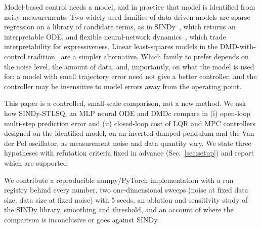 Model-based control needs a model, and in practice that model is identified from noisy measurements. Two widely used families of data-driven models are sparse regression on a library of candidate terms, as in SINDy~\cite{brunton2016discovering,brunton2016sparse}, which returns an interpretable ODE, and flexible neural-network dynamics~\cite{chen2018neural,nagabandi2018neural}, which trade interpretability for expressiveness. Linear least-squares models in the DMD-with-control tradition~\cite{proctor2016dynamic} are a simpler alternative. Which family to prefer depends on the noise level, the amount of data, and, importantly, on what the model is used for: a model with small trajectory error need not give a better controller, and the controller may be insensitive to model errors away from the operating point.

This paper is a controlled, small-scale comparison, not a new method. We ask how SINDy-STLSQ, an MLP neural ODE and DMDc compare in (i) open-loop multi-step prediction error and (ii) closed-loop cost of LQR and MPC controllers designed on the identified model, on an inverted damped pendulum and the Van der Pol oscillator, as measurement noise and data quantity vary. We state three hypotheses with refutation criteria fixed in advance (Sec.~\ref{sec:setup}) and report which are supported.

We contribute a reproducible numpy/PyTorch implementation with a run registry behind every number, two one-dimensional sweeps (noise at fixed data size, data size at fixed noise) with 5 seeds, an ablation and sensitivity study of the SINDy library, smoothing and threshold, and an account of where the comparison is inconclusive or goes against SINDy.
